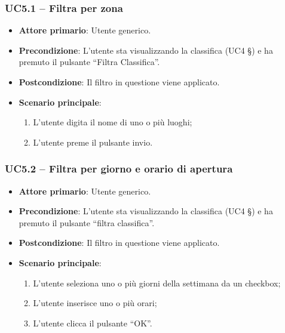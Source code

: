 \subsubsection{UC5.1 – Filtra per zona}
\begin{itemize}
    \item \textbf{Attore primario}: Utente generico.
    \item \textbf{Precondizione}: L’utente sta visualizzando la classifica (UC4 §) e ha premuto il pulsante “Filtra Classifica”.
    \item \textbf{Postcondizione}: Il filtro in questione viene applicato.
    \item \textbf{Scenario principale}: 
    \begin{enumerate}
        \item L’utente digita il nome di uno o più luoghi;
        \item L’utente preme il pulsante invio.
    \end{enumerate}
\end{itemize}

\subsubsection{UC5.2 – Filtra per giorno e orario di apertura}
\begin{itemize}
    \item \textbf{Attore primario}: Utente generico.
    \item \textbf{Precondizione}: L’utente sta visualizzando la classifica (UC4 §) e ha premuto il pulsante “filtra classifica”.
    \item \textbf{Postcondizione}: Il filtro in questione viene applicato.
    \item \textbf{Scenario principale}: 
    \begin{enumerate}
        \item L’utente seleziona uno o più giorni della settimana da un checkbox;
        \item L’utente inserisce uno o più orari;
        \item L’utente clicca il pulsante “OK”.
    \end{enumerate}
\end{itemize}

